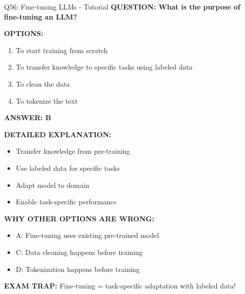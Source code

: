 \documentclass[8pt]{beamer}
\begin{document}
	\begin{frame}{Q56: Fine-tuning LLMs - Tutorial}
		\fontsize{6.5}{7.5}\selectfont
		\textbf{QUESTION: What is the purpose of fine-tuning an LLM?}
		
		\vspace{0.1cm}
		\textbf{OPTIONS:}
		\begin{enumerate}
			\item To start training from scratch
			\item To transfer knowledge to specific tasks using labeled data
			\item To clean the data
			\item To tokenize the text
		\end{enumerate}
		
		\vspace{0.1cm}
		\textcolor{myblue}{\textbf{ANSWER: B}}
		
		\vspace{0.1cm}
		\textbf{DETAILED EXPLANATION:}
		\begin{itemize}
			\item Transfer knowledge from pre-training
			\item Use labeled data for specific tasks
			\item Adapt model to domain
			\item Enable task-specific performance
		\end{itemize}
		
		\vspace{0.1cm}
		\textcolor{myred}{\textbf{WHY OTHER OPTIONS ARE WRONG:}}
		\begin{itemize}
			\item \textcolor{myred}{A:} Fine-tuning uses existing pre-trained model
			\item \textcolor{myred}{C:} Data cleaning happens before training
			\item \textcolor{myred}{D:} Tokenization happens before training
		\end{itemize}
		
		\textcolor{myred}{\textbf{EXAM TRAP:}} Fine-tuning = \textcolor{myblue}{task-specific adaptation} with labeled data!
	\end{frame}
	
\end{document}
